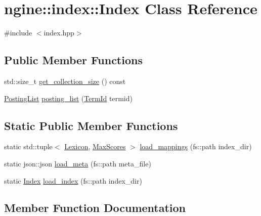 \hypertarget{classngine_1_1index_1_1Index}{}\section{ngine\+:\+:index\+:\+:Index Class Reference}
\label{classngine_1_1index_1_1Index}


{\ttfamily \#include $<$index.\+hpp$>$}

\subsection*{Public Member Functions}
\begin{DoxyCompactItemize}
\item 
std\+::size\+\_\+t \hyperlink{classngine_1_1index_1_1Index_a12872ec038786e8d4638905d91760fb9}{get\+\_\+collection\+\_\+size} () const
\item 
\hyperlink{classngine_1_1PostingList}{Posting\+List} \hyperlink{classngine_1_1index_1_1Index_a16ee97b24b45a756150e5e6457cacfbf}{posting\+\_\+list} (\hyperlink{structngine_1_1TermId}{Term\+Id} termid)
\end{DoxyCompactItemize}
\subsection*{Static Public Member Functions}
\begin{DoxyCompactItemize}
\item 
static std\+::tuple$<$ \hyperlink{namespacengine_a97aa1030dca95ffefec4e7487a155015}{Lexicon}, \hyperlink{namespacengine_a92bfb5e91078f4b4dffe6f960f0f2016}{Max\+Scores} $>$ \hyperlink{classngine_1_1index_1_1Index_a55128a0d53ab461b7a90887eb0d9297e}{load\+\_\+mappings} (fs\+::path index\+\_\+dir)
\item 
static json\+::json \hyperlink{classngine_1_1index_1_1Index_a26301d022347cd6756fd3974a6535f15}{load\+\_\+meta} (fs\+::path meta\+\_\+file)
\item 
static \hyperlink{classngine_1_1index_1_1Index}{Index} \hyperlink{classngine_1_1index_1_1Index_a833aa7f67059cc44567e9752526ebe2e}{load\+\_\+index} (fs\+::path index\+\_\+dir)
\end{DoxyCompactItemize}


\subsection{Member Function Documentation}
\mbox{\label{classngine_1_1index_1_1Index_a12872ec038786e8d4638905d91760fb9}} 
